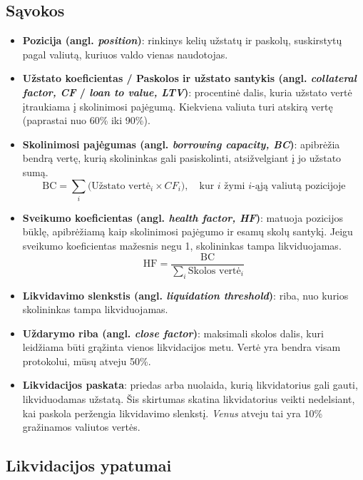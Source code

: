 \documentclass[]{VUMIFTemplateClass}
\begin{document}
\subsection{Sąvokos}
\begin{itemize}
  \item \textbf{Pozicija (angl. \textit{position})}: rinkinys kelių užstatų ir paskolų, suskirstytų pagal valiutą, kuriuos valdo vienas naudotojas.
  \item \textbf{Užstato koeficientas / Paskolos ir užstato santykis (angl. \textit{collateral factor, CF} / \textit{loan to value, LTV})}: procentinė dalis, kuria užstato vertė įtraukiama į skolinimosi pajėgumą. Kiekviena valiuta turi atskirą vertę (paprastai nuo 60\% iki 90\%).
  \item \textbf{Skolinimosi pajėgumas (angl. \textit{borrowing capacity, BC})}: apibrėžia bendrą vertę, kurią skolininkas gali pasiskolinti, atsižvelgiant į jo užstato sumą.
    \begin{equation}
        \text{BC} = \sum_{i} \bigl(\text{Užstato vertė}_{i} \times CF_{i}\bigr), \quad \text{kur } i \text{ žymi } i\text{-ąją valiutą pozicijoje}
        \label{eq:borrowing_capacity}
    \end{equation}
  \item \textbf{Sveikumo koeficientas (angl. \textit{health factor, HF})}: matuoja pozicijos būklę, apibrėžiamą kaip skolinimosi pajėgumo ir esamų skolų santykį. Jeigu sveikumo koeficientas mažesnis negu 1, skolininkas tampa likviduojamas.
    \begin{equation}
        \text{HF} = \frac{\text{BC}}{\sum_{i} \text{Skolos vertė}_{i}}
        \label{eq:health_factor}
    \end{equation}
  \item \textbf{Likvidavimo slenkstis (angl. \textit{liquidation threshold})}: riba, nuo kurios skolininkas tampa likviduojamas.
  \item \textbf{Uždarymo riba (angl. \textit{close factor})}: maksimali skolos dalis, kuri leidžiama būti grąžinta vienos likvidacijos metu. Vertė yra bendra visam protokolui, mūsų atveju 50\%.
  \item \textbf{Likvidacijos paskata}: priedas arba nuolaida, kurią likvidatorius gali gauti, likviduodamas užstatą.
  Šis skirtumas skatina likvidatorius veikti nedelsiant, kai paskola peržengia likvidavimo slenkstį. \textit{Venus} atveju tai yra 10\% gražinamos valiutos vertės.
\end{itemize}

\subsection{Likvidacijos ypatumai}
\label{sec:likivdacijos_ypatumai}
\end{document}

